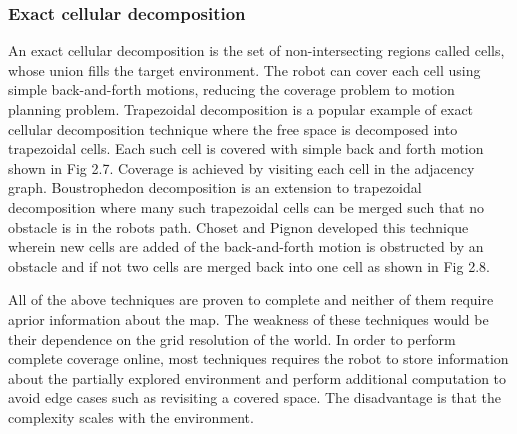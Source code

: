 \subsubsection{Exact cellular decomposition}
An exact cellular decomposition is the set of non-intersecting regions called cells, whose union fills the target environment\cite{35}. The robot can cover each cell using simple back-and-forth motions, reducing the coverage problem to motion planning problem.
Trapezoidal decomposition\cite{40} is a popular example of exact cellular decomposition technique where the free space is decomposed into trapezoidal cells. Each such cell is covered with simple back and forth motion shown in Fig 2.7. Coverage is achieved by visiting each cell in the adjacency graph. 
Boustrophedon decomposition is an extension to trapezoidal decomposition where many such trapezoidal cells can be merged such that no obstacle is in the robots path. Choset and Pignon\cite{35} developed this technique wherein new cells are added of the back-and-forth motion is obstructed by an obstacle and if not two cells are merged back into one cell as shown in Fig 2.8. 

\par All of the above techniques are proven to complete and neither of them require aprior information about the map. The weakness of these techniques would be their dependence on the grid resolution of the world. In order to perform complete coverage online, most techniques requires the robot to store information about the partially explored environment and perform additional computation to avoid edge cases such as revisiting a covered space. The disadvantage is that the complexity scales with the environment.  

